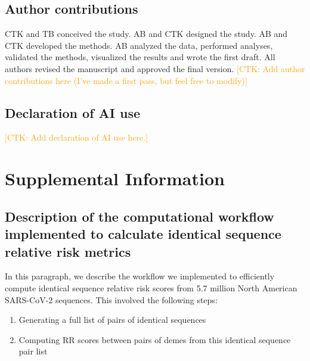 \documentclass[11pt, letterpaper, oneside]{article}
\def\ctkc#1{\textcolor{orange}{[CTK: #1]}}
\begin{document}
\subsection*{Author contributions}
CTK and TB conceived the study.
AB and CTK designed the study. 
AB and CTK developed the methods. 
AB analyzed the data, performed analyses, validated the methods, visualized the results and wrote the first draft.
All authors revised the manuscript and approved the final version.
\ctkc{Add author contributions here (I've made a first pass, but feel free to modify)}

\subsection*{Declaration of AI use}
\ctkc{Add declaration of AI use here.}

\printbibliography

\pagebreak

\setcounter{figure}{0}
\setcounter{table}{0}
\setcounter{page}{1}
\renewcommand{\thefigure}{S\arabic{figure}}
\renewcommand{\thetable}{S\arabic{table}}
\renewcommand{\thepage}{S\arabic{page}}

\section{Supplemental Information}

\subsection{Description of the computational workflow implemented to calculate identical sequence relative risk metrics}
In this paragraph, we describe the workflow we implemented to efficiently compute identical sequence relative risk scores from 5.7 million North American SARS-CoV-2 sequences.
This involved the following steps:
\begin{enumerate}
    \item Generating a full list of pairs of identical sequences
    \item Computing RR scores between pairs of demes from this identical sequence pair list
\end{enumerate}
\end{document}

